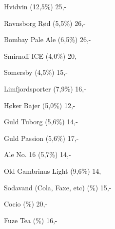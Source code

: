 \documentclass{article}
\begin{document}

\maketitle

\null
\vspace{-0.8cm}


\vspace{0.3cm}

Hvidvin {\large (12,5\%)}  \hfill 25,-

\vspace{0.3cm}

Ravnsborg Rød {\large (5,5\%)}  \hfill 26,-

\vspace{0.3cm}

Bombay Pale Ale {\large (6,5\%)}  \hfill 26,-

\vspace{1.3cm}

Smirnoff ICE {\large (4,0\%)}  \hfill 20,-

\vspace{0.3cm}

Somersby {\large (4,5\%)} \hfill 15,-

\vspace{1.3cm}

Limfjordsporter {\large (7,9\%)}  \hfill 16,-

\vspace{1.3cm}

Høker Bajer {\large (5,0\%)} \hfill 12,-

\vspace{1.3cm}

Guld Tuborg {\large (5,6\%)} \hfill 14,-

\vspace{0.3cm}

Guld Passion {\large (5,6\%)} \hfill 17,-

\vspace{0.3cm}

Ale No. 16 {\large (5,7\%)} \hfill 14,-

\vspace{0.3cm}

Old Gambrinus Light {\large (9,6\%)} \hfill 14,-

\vspace{1.3cm}

Sodavand (Cola, Faxe, etc) {\large (\frownie{}\%)} \hfill 15,-

\vspace{0.3cm}

Cocio {\large (\frownie{}\%)}  \hfill 20,-

\vspace{0.3cm}

Fuze Tea {\large (\frownie{}\%)}  \hfill 16,-

\underskriv
\end{document}
